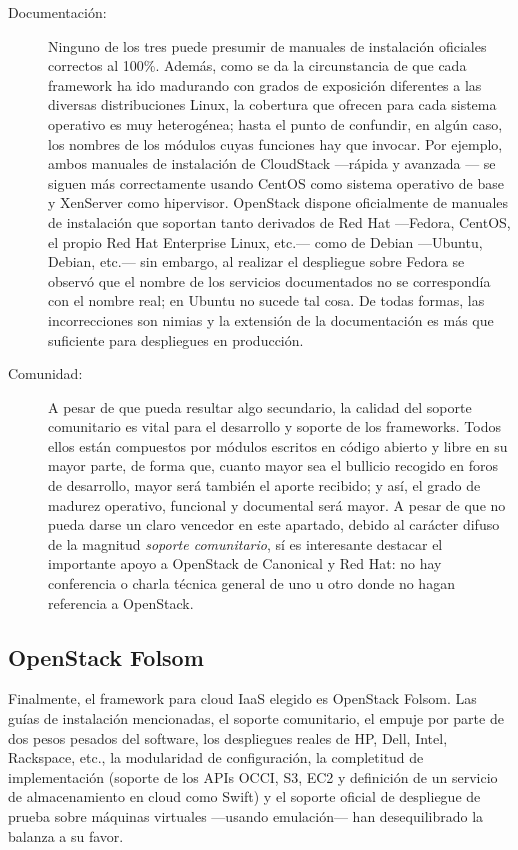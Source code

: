 \begin{description}
 \item[Documentaci\'on:] Ninguno de los tres puede presumir de manuales de instalaci\'on oficiales correctos al 100\%. Adem\'as, como se da la circunstancia de que cada framework ha ido madurando con grados de exposici\'on diferentes a las diversas distribuciones Linux, la cobertura que ofrecen para cada sistema operativo es muy heterog\'enea; hasta el punto de confundir, en alg\'un caso, los nombres de los m\'odulos cuyas funciones hay que invocar. Por ejemplo, ambos manuales de instalaci\'on de CloudStack ---r\'apida \cite{cloudstackadvinstall} y avanzada \cite{cloudstackquickinstall}--- se siguen m\'as correctamente usando CentOS como sistema operativo de base y XenServer como hipervisor. OpenStack dispone oficialmente de manuales de ins\-ta\-la\-ci\'on que soportan tanto derivados de Red Hat ---Fedora, CentOS, el propio Red Hat Enterprise Linux, etc.--- como de Debian ---Ubuntu, Debian, etc.--- sin embargo, al realizar el despliegue sobre Fedora se observ\'o que el nombre de los servicios documentados no se correspond\'ia con el nombre real; en Ubuntu no sucede tal cosa. De todas formas, las incorrecciones son nimias y la extensi\'on de la documentaci\'on es m\'as que suficiente para despliegues en producci\'on.
 \item[Comunidad:] A pesar de que pueda resultar algo secundario, la calidad del soporte comunitario es vital para el desarrollo y soporte de los frameworks. Todos ellos est\'an compuestos por m\'odulos escritos en c\'odigo abierto y libre en su mayor parte, de forma que, cuanto mayor sea el bullicio recogido en foros de desarrollo, mayor ser\'a tambi\'en el aporte recibido; y as\'i, el grado de madurez operativo, funcional y documental ser\'a mayor. A pesar de que no pueda darse un claro vencedor en este apartado, debido al car\'acter difuso de la magnitud \emph{soporte comunitario}, s\'i es interesante destacar el importante apoyo a OpenStack de Canonical y Red Hat: no hay conferencia o charla t\'ecnica general de uno u otro donde no hagan referencia a OpenStack.
\end{description}

\subsection{OpenStack Folsom}\label{subsec:openstackfolsom}
\noindent Finalmente, el framework para cloud IaaS elegido es OpenStack Folsom. Las gu\'ias de instalaci\'on mencionadas, el soporte comunitario, el empuje por parte de dos pesos pesados del software, los despliegues reales de HP, Dell, Intel, Rackspace, etc., la modularidad de configuraci\'on, la completitud de implementaci\'on (soporte de los APIs OCCI, S3, EC2 y definici\'on de un servicio de almacenamiento en cloud como Swift) y el soporte oficial de despliegue de prueba sobre m\'aquinas virtuales ---usando emulaci\'on--- han desequilibrado la balanza a su favor.
